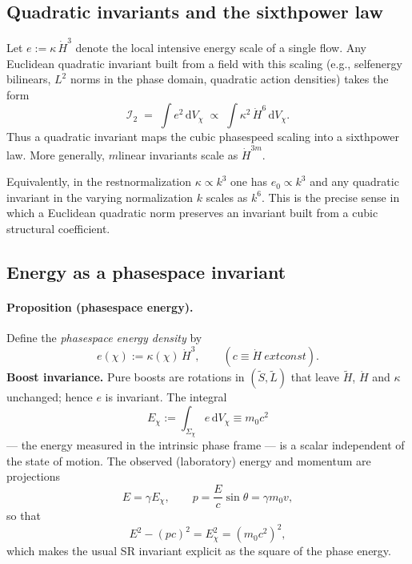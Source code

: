 \documentclass[11pt,a4paper]{article}
\newcommand{\tH}{\tilde{H}}
\newcommand{\tS}{\tilde{S}}
\newcommand{\tL}{\tilde{L}}
\newcommand{\dd}{\mathrm{d}}
\newcommand{\ga}{\gamma}
\begin{document}
\subsection{Quadratic invariants and the sixth\textendash power law}
Let $e := \kappa\,\dot H^{3}$ denote the local intensive energy scale of a single flow. Any Euclidean quadratic invariant built from a field with this scaling (e.g., self\textendash energy bilinears, $L^2$ norms in the phase domain, quadratic action densities) takes the form
\begin{equation}
  \mathcal I_2 \;=\; \int e^2\,\dd V_{\chi} \;\propto\; \int \kappa^{2}\,\dot H^{6}\,\dd V_{\chi} .
\end{equation}
Thus a quadratic invariant maps the cubic phase\textendash speed scaling into a sixth\textendash power law. More generally, $m$\textendash linear invariants scale as $\dot H^{3m}$.

Equivalently, in the rest\textendash normalization $\kappa\propto k^3$ one has $e_0\propto k^3$ and any quadratic invariant in the varying normalization $k$ scales as $k^6$. This is the precise sense in which a Euclidean quadratic norm preserves an invariant built from a cubic structural coefficient.


\subsection{Energy as a phase\textendash space invariant}
\paragraph{Proposition (phase\textendash space energy).}
Define the \emph{phase\textendash space energy density} by
\begin{equation}
  e(\chi) := \kappa(\chi)\,\dot H^{3},\qquad (c\equiv \dot H\ 	ext{const}).
\end{equation}
\textbf{Boost invariance.} Pure boosts are rotations in $(\tS,\tL)$ that leave $\tH$, $\dot H$ and $\kappa$ unchanged; hence $e$ is invariant. The integral
\begin{equation}
  E_{\chi} := \int_{\Sigma_{\chi}} e\,\dd V_{\chi} \equiv m_0 c^2
\end{equation}
— the energy measured in the intrinsic phase frame — is a scalar independent of the state of motion. The observed (laboratory) energy and momentum are projections
\begin{equation}
  E = \ga E_{\chi},\qquad p = \frac{E}{c}\sin\theta = \ga m_0 v,
\end{equation}
so that
\begin{equation}
  E^2 - (pc)^2 = E_{\chi}^{2} = (m_0 c^2)^2,
\end{equation}
which makes the usual SR invariant explicit as the square of the phase energy.
\end{document}
